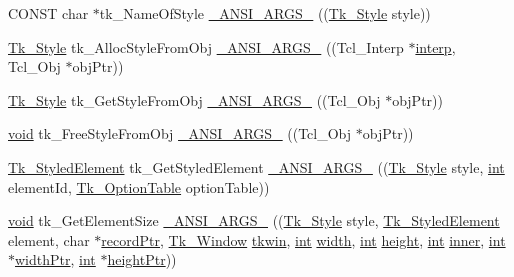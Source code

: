\begin{DoxyCompactItemize}
\item 
C\+O\+N\+ST char $\ast$tk\+\_\+\+Name\+Of\+Style \hyperlink{struct_tk_stubs_abdbe46c3a9034f9031b7cb6eaf64115c}{\+\_\+\+A\+N\+S\+I\+\_\+\+A\+R\+G\+S\+\_\+} ((\hyperlink{tk_8h_aa71c7ce9e7b5bd71b0a8afd9fdb6e860}{Tk\+\_\+\+Style} style))
\item 
\hyperlink{tk_8h_aa71c7ce9e7b5bd71b0a8afd9fdb6e860}{Tk\+\_\+\+Style} tk\+\_\+\+Alloc\+Style\+From\+Obj \hyperlink{struct_tk_stubs_a0cf7ba7873cbce351c24e57b7b69070d}{\+\_\+\+A\+N\+S\+I\+\_\+\+A\+R\+G\+S\+\_\+} ((Tcl\+\_\+\+Interp $\ast$\hyperlink{tk_8h_a5ab79c0f5849ee8e6a2e955a6c536cc0}{interp}, Tcl\+\_\+\+Obj $\ast$obj\+Ptr))
\item 
\hyperlink{tk_8h_aa71c7ce9e7b5bd71b0a8afd9fdb6e860}{Tk\+\_\+\+Style} tk\+\_\+\+Get\+Style\+From\+Obj \hyperlink{struct_tk_stubs_a6338f51ac267a712744e463cabcbc684}{\+\_\+\+A\+N\+S\+I\+\_\+\+A\+R\+G\+S\+\_\+} ((Tcl\+\_\+\+Obj $\ast$obj\+Ptr))
\item 
\hyperlink{tk_8h_aba408b7cd755a96426e004c015f5de8e}{void} tk\+\_\+\+Free\+Style\+From\+Obj \hyperlink{struct_tk_stubs_aceec75ccd4eddbf520c758fdeaa30850}{\+\_\+\+A\+N\+S\+I\+\_\+\+A\+R\+G\+S\+\_\+} ((Tcl\+\_\+\+Obj $\ast$obj\+Ptr))
\item 
\hyperlink{tk_8h_a9ad9f56129bda39e45e496bc690e4fc5}{Tk\+\_\+\+Styled\+Element} tk\+\_\+\+Get\+Styled\+Element \hyperlink{struct_tk_stubs_a10f25ad8d6c1d4eb96e33da6e5db4759}{\+\_\+\+A\+N\+S\+I\+\_\+\+A\+R\+G\+S\+\_\+} ((\hyperlink{tk_8h_aa71c7ce9e7b5bd71b0a8afd9fdb6e860}{Tk\+\_\+\+Style} style, \hyperlink{tk_8h_a83f82f76e7fed06f4c49d2db94028a6d}{int} element\+Id, \hyperlink{tk_8h_ae181e27708067a6390bf088d8a17b5e1}{Tk\+\_\+\+Option\+Table} option\+Table))
\item 
\hyperlink{tk_8h_aba408b7cd755a96426e004c015f5de8e}{void} tk\+\_\+\+Get\+Element\+Size \hyperlink{struct_tk_stubs_a9bff325ceade9c6aa9f43369c3db4fba}{\+\_\+\+A\+N\+S\+I\+\_\+\+A\+R\+G\+S\+\_\+} ((\hyperlink{tk_8h_aa71c7ce9e7b5bd71b0a8afd9fdb6e860}{Tk\+\_\+\+Style} style, \hyperlink{tk_8h_a9ad9f56129bda39e45e496bc690e4fc5}{Tk\+\_\+\+Styled\+Element} element, char $\ast$\hyperlink{tk_8h_ac9ba2e58d9bf54ae4b21855053aa52da}{record\+Ptr}, \hyperlink{tk_8h_ab756137de3ee74edc2501bd0d761e37c}{Tk\+\_\+\+Window} \hyperlink{tk_8h_a35df722e7e1b6efd651683b8be7c1490}{tkwin}, \hyperlink{tk_8h_a83f82f76e7fed06f4c49d2db94028a6d}{int} \hyperlink{tk_8h_a29e50a5401c1396b3a2aa3487f74d468}{width}, \hyperlink{tk_8h_a83f82f76e7fed06f4c49d2db94028a6d}{int} \hyperlink{tk_8h_a67be2f4b9d9c5b3559139bfb072e2e81}{height}, \hyperlink{tk_8h_a83f82f76e7fed06f4c49d2db94028a6d}{int} \hyperlink{tk_8h_a32439d4657a2f3b9b9054b532864c88a}{inner}, \hyperlink{tk_8h_a83f82f76e7fed06f4c49d2db94028a6d}{int} $\ast$\hyperlink{tk_8h_a9d4e66c5fb59e1d411890002b9532c50}{width\+Ptr}, \hyperlink{tk_8h_a83f82f76e7fed06f4c49d2db94028a6d}{int} $\ast$\hyperlink{tk_8h_aad4802414ac93ed83b125396e0a1a083}{height\+Ptr}))

\end{DoxyCompactItemize}
